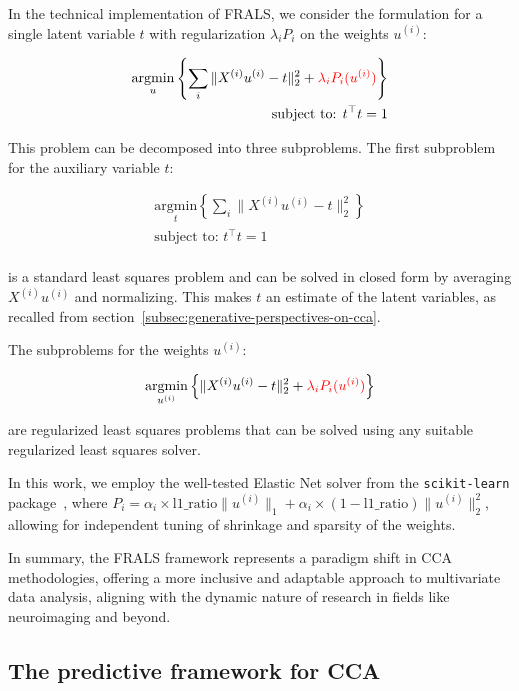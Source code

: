 In the technical implementation of FRALS, we consider the formulation for a single latent variable \(t\) with regularization \(\lambda_i P_i\) on the weights \(u^{(i)}\):

\begin{align}
    \underset{u}{\mathrm{argmin}}\left\{\sum_i \|X^{(i)} u^{(i)} - t\|_2^2 + \textcolor{red}{\lambda_i P_i(u^{(i)})} \right\}\\
    \text{subject to: }t^\top t = 1\\
\end{align}

This problem can be decomposed into three subproblems. The first subproblem for the auxiliary variable \(t\):

\begin{align}
    \underset{t}{\mathrm{argmin}}\left\{\sum_i \|X^{(i)} u^{(i)} - t\|_2^2\right\}\\
    \text{subject to: }t^\top t = 1\\
\end{align}

is a standard least squares problem and can be solved in closed form by averaging \(X^{(i)} u^{(i)}\) and normalizing. This makes \(t\) an estimate of the latent variables, as recalled from section~\ref{subsec:generative-perspectives-on-cca}.

The subproblems for the weights \(u^{(i)}\):

\begin{align}
    \underset{u^{(i)}}{\mathrm{argmin}}\left\{\|X^{(i)} u^{(i)} - t\|_2^2 + \textcolor{red}{\lambda_i P_i(u^{(i)})} \right\}\\
\end{align}

are regularized least squares problems that can be solved using any suitable regularized least squares solver.

In this work, we employ the well-tested Elastic Net solver from the \texttt{scikit-learn} package~\citep{pedregosa2011scikit}, where \(P_i = \alpha_i \times \text{l1\_ratio} \|u^{(i)}\|_1 + \alpha_i \times (1-\text{l1\_ratio}) \|u^{(i)}\|_2^2\), allowing for independent tuning of shrinkage and sparsity of the weights.

In summary, the FRALS framework represents a paradigm shift in CCA methodologies, offering a more inclusive and adaptable approach to multivariate data analysis, aligning with the dynamic nature of research in fields like neuroimaging and beyond.

\subsection{The predictive framework for CCA}\label{subsec:the-predictive-framework-for-cca}

